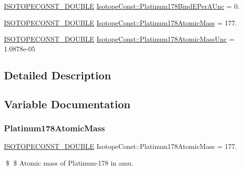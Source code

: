 \begin{DoxyCompactItemize}
\mbox{\hyperlink{group___isotope_const-_macros_ga8f45a7272ce02c0b4c65c44636ed719a}{I\+S\+O\+T\+O\+P\+E\+C\+O\+N\+S\+T\+\_\+\+D\+O\+U\+B\+LE}} \mbox{\hyperlink{group___isotope_const-_platinum-_pt178_ga06afa5500ef0a4e99b221497060d3025}{Isotope\+Const\+::\+Platinum178\+Bind\+E\+Per\+A\+Unc}} = 0.
\item 
\mbox{\hyperlink{group___isotope_const-_macros_ga8f45a7272ce02c0b4c65c44636ed719a}{I\+S\+O\+T\+O\+P\+E\+C\+O\+N\+S\+T\+\_\+\+D\+O\+U\+B\+LE}} \mbox{\hyperlink{group___isotope_const-_platinum-_pt178_ga285a962be91f862912c0fd99eb72d208}{Isotope\+Const\+::\+Platinum178\+Atomic\+Mass}} = 177.
\item 
\mbox{\hyperlink{group___isotope_const-_macros_ga8f45a7272ce02c0b4c65c44636ed719a}{I\+S\+O\+T\+O\+P\+E\+C\+O\+N\+S\+T\+\_\+\+D\+O\+U\+B\+LE}} \mbox{\hyperlink{group___isotope_const-_platinum-_pt178_ga0688a50cad1aecfe44394a54bfed9027}{Isotope\+Const\+::\+Platinum178\+Atomic\+Mass\+Unc}} = 1.\+0878e-\/05
\end{DoxyCompactItemize}


\subsection{Detailed Description}


\subsection{Variable Documentation}
\mbox{\label{group___isotope_const-_platinum-_pt178_ga285a962be91f862912c0fd99eb72d208}} 
\subsubsection{\texorpdfstring{Platinum178\+Atomic\+Mass}{Platinum178AtomicMass}}
{\footnotesize\ttfamily \mbox{\hyperlink{group___isotope_const-_macros_ga8f45a7272ce02c0b4c65c44636ed719a}{I\+S\+O\+T\+O\+P\+E\+C\+O\+N\+S\+T\+\_\+\+D\+O\+U\+B\+LE}} Isotope\+Const\+::\+Platinum178\+Atomic\+Mass = 177.}

\$ \$ Atomic mass of Platinum-\/178 in amu. \mbox{\label{group___isotope_const-_platinum-_pt178_ga0688a50cad1aecfe44394a54bfed9027}} 

